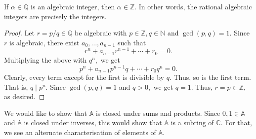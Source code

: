 \begin{prop} \label{prop:rationalalgintareint}
	If $\alpha \in \mathbb{Q}$ is an algebraic integer, then $\alpha \in \mathbb{Z}.$ In other words, the rational algebraic integers are precisely the integers.
\end{prop}
\begin{proof} 
	Let $r = p/q \in \mathbb{Q}$ be algebraic with $p \in \mathbb{Z}, q \in \mathbb{N}$ and $\gcd(p, q) = 1.$ Since $r$ is algebraic, there exist $a_0, \ldots, a_{n-1}$ such that
	\begin{equation*} 
		r^n + a_{n - 1}r^{n - 1} + \cdots + r_0 = 0.
	\end{equation*}
	Multiplying the above with $q^n,$ we get
	\begin{equation*} 
		p^n + a_{n - 1}p^{n - 1}q + \cdots + r_0q^n = 0.
	\end{equation*}
	Clearly, every term except for the first is divisible by $q.$ Thus, so is the first term. That is, $q \mid p^n.$ Since $\gcd(p, q) = 1$ and $q > 0,$ we get $q = 1.$ Thus, $r = p \in \mathbb{Z},$ as desired.
\end{proof}

We would like to show that $\mathbb{A}$ is closed under sums and products. Since $0, 1 \in \mathbb{A}$ and $\mathbb{A}$ is closed under inverses, this would show that $\mathbb{A}$ is a subring of $\mathbb{C}.$ For that, we see an alternate characterisation of elements of $\mathbb{A}.$

